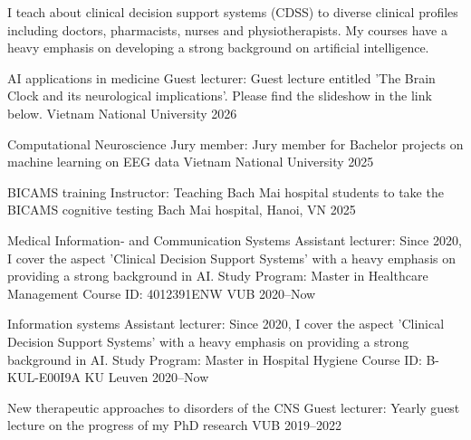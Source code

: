
I teach about clinical decision support systems (CDSS) to diverse clinical profiles including doctors, pharmacists, nurses and physiotherapists. My courses have a heavy emphasis on developing a strong background on artificial intelligence.

\begin{cvhonors}

  \cvhonor
    {AI applications in medicine} %
    {Guest lecturer: Guest lecture entitled 'The Brain Clock and its neurological implications'. Please find the slideshow in the link below.} %
    {Vietnam National University} %
    {2026} %


  \cvhonor
    {Computational Neuroscience} %
    {Jury member: Jury member for Bachelor projects on machine learning on EEG data} %
    {Vietnam National University} %
    {2025} %


  \cvhonor
    {BICAMS training} %
    {Instructor: Teaching Bach Mai hospital students to take the BICAMS cognitive testing} %
    {Bach Mai hospital, Hanoi, VN} %
    {2025} %


  \cvhonor
    {Medical Information- and Communication Systems} %
    {Assistant lecturer: Since 2020, I cover the aspect 'Clinical Decision Support Systems' with a heavy emphasis on providing a strong background in AI. Study Program: Master in Healthcare Management Course ID: 4012391ENW} %
    {VUB} %
    {2020--Now} %


  \cvhonor
    {Information systems} %
    {Assistant lecturer: Since 2020, I cover the aspect 'Clinical Decision Support Systems' with a heavy emphasis on providing a strong background in AI. Study Program: Master in Hospital Hygiene Course ID: B-KUL-E00I9A} %
    {KU Leuven} %
    {2020--Now} %


  \cvhonor
    {New therapeutic approaches to disorders of the CNS} %
    {Guest lecturer: Yearly guest lecture on the progress of my PhD research} %
    {VUB} %
    {2019--2022} %


\end{cvhonors}